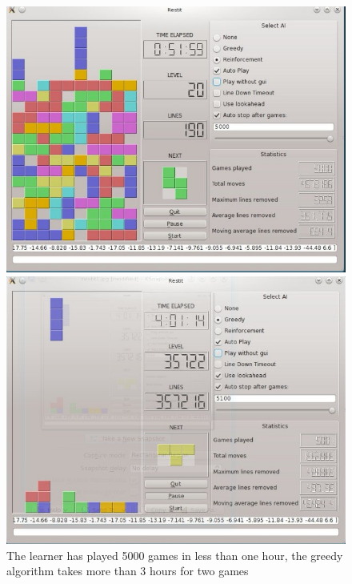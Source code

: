 \documentclass{ml}
\begin{document}
\begin{figure}[h!]
\centering
\begin{minipage}[t]{0.49\textwidth}
\includegraphics[width=\textwidth]{img/restit.jpg}
\end{minipage}
\begin{minipage}[t]{0.49\textwidth}
\includegraphics[width=\textwidth]{img/video1.jpg}
\end{minipage}
\caption{\footnotesize{The learner has played 5000 games in less than one hour, the greedy algorithm takes more than 3 hours for two games}}
\label{demo}
\end{figure}
\end{document}
